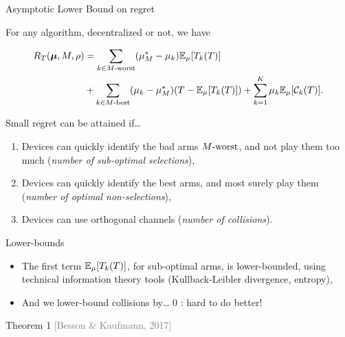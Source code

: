 \documentclass[12pt,english,ignorenonframetext,aspectratio=169,]{beamer}
\providecommand{\tightlist}{%
  \setlength{\itemsep}{0pt}\setlength{\parskip}{0pt}}
\begin{document}
\begin{frame}[allowframebreaks]{Asymptotic Lower Bound on regret}

\vspace*{-3pt}
For any algorithm, decentralized or not, we have
\vspace*{-5pt}
\begin{small}\begin{align*}
  R_T(\boldsymbol{\mu}, M, \rho) &= \sum_{k \in M\text{-}\mathrm{worst}} (\mu_M^* -  \mu_k) \mathbb{E}_{\mu}[T_k(T)] \\
  &+ \sum_{k \in M\text{-}\mathrm{best}} (\mu_k -  \mu_M^*) (T - \mathbb{E}_{\mu}[T_k(T)]) + \sum_{k=1}^{K} \mu_k \mathbb{E}_{\mu}[\mathcal{C}_k(T)].
\end{align*}\end{small}
\vspace*{-5pt}
\begin{block}{Small regret can be attained if\ldots{}}

\begin{enumerate}
\def\labelenumi{\arabic{enumi}.}
\tightlist
\item
  Devices can quickly identify the bad arms \(M\text{-}\mathrm{worst}\), and not play
  them too much (\emph{number of sub-optimal selections}),
\item
  Devices can quickly identify the best arms, and most surely play them
  (\emph{number of optimal non-selections}),
\item
  Devices can use orthogonal channels (\emph{number of collisions}).
\end{enumerate}

\end{block}

\vspace*{-5pt}
\begin{block}{Lower-bounds}

\begin{itemize}
\tightlist
\item
  The first term \(\mathbb{E}_{\mu}[T_k(T)]\), for sub-optimal arms,
  is lower-bounded, using technical information theory tools
  (Kullback-Leibler divergence, entropy),
\item
  And we lower-bound collisions by\ldots{} \(0\) : hard to do better!
\end{itemize}

\end{block}

\begin{block}{Theorem 1
\hfill{}\textcolor{gray}{[Besson \& Kaufmann, 2017]}}


\end{block}
\end{frame}
\end{document}
